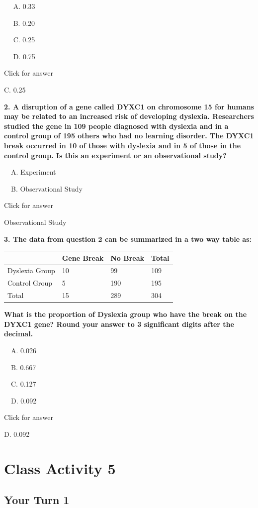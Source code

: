 \documentclass[
]{book}
\begin{document}
  A. 0.33

  B. 0.20

  C. 0.25

  D. 0.75

Click for answer

C. 0.25

\textbf{2. A disruption of a gene called DYXC1 on chromosome 15 for humans may be related to an increased risk of developing dyslexia. Researchers studied the gene in 109 people diagnosed with dyslexia and in a control group of 195 others who had no learning disorder. The DYXC1 break occurred in 10 of those with dyslexia and in 5 of those in the control group. Is this an experiment or an observational study?}

 A. Experiment

 B. Observational Study

Click for answer

Observational Study

\textbf{3. The data from question 2 can be summarized in a two way table as:}

\begin{longtable}[]{@{}llll@{}}
\toprule()
~ & Gene Break & No Break & Total \\
\midrule()
\endhead
Dyslexia Group & 10 & 99 & 109 \\
Control Group & 5 & 190 & 195 \\
Total & 15 & 289 & 304 \\
\bottomrule()
\end{longtable}

\textbf{What is the proportion of Dyslexia group who have the break on the DYXC1 gene? Round your answer to 3 significant digits after the decimal.}

 A. 0.026

 B. 0.667

 C. 0.127

 D. 0.092

Click for answer

D. 0.092

\hypertarget{class-activity-5}{%
\chapter{Class Activity 5}\label{class-activity-5}}

\hypertarget{your-turn-1-3}{%
\section{Your Turn 1}\label{your-turn-1-3}}
\end{document}
